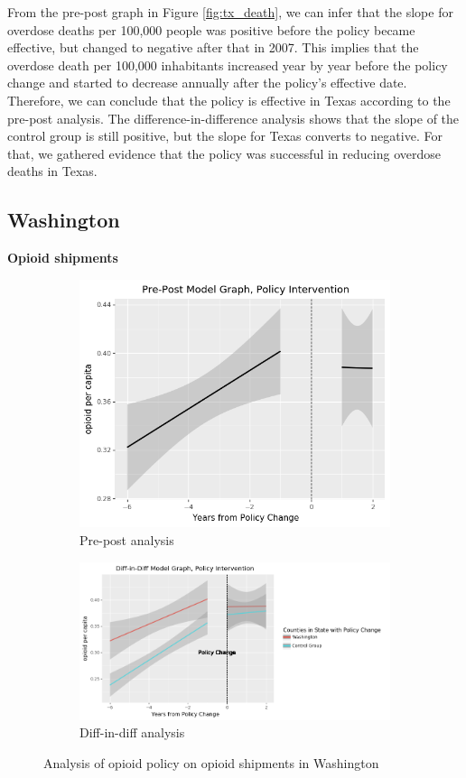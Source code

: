\documentclass[12pt,letterpaper]{article}
\begin{document}
From the pre-post graph in Figure \ref{fig:tx_death}, we can infer that the slope for overdose deaths per 100,000 people was positive before the policy became effective, but changed to negative after that in 2007. This implies that the overdose death per 100,000 inhabitants increased year by year before the policy change and started to decrease annually after the policy's effective date. Therefore, we can conclude that the policy is effective in Texas according to the pre-post analysis. The difference-in-difference analysis shows that the slope of  the control group is still positive, but the slope for Texas converts to negative. For that, we gathered evidence that the policy was successful in reducing overdose deaths in Texas.

\subsection{Washington}
\textbf{Opioid shipments}

\begin{figure}[!h]
\centering
\begin{subfigure}{.5\textwidth}
  \centering
  \includegraphics[width=0.7\linewidth]{../30_results/General_Results/washington_opioid_shipment_prepost.png}
  \caption{Pre-post analysis}
  \label{fig:wa_ship_prepost}
\end{subfigure}%
\begin{subfigure}{.55\textwidth}
  \centering
  \includegraphics[width=1\linewidth]{../30_results/General_Results/washington_opioid_shipment_diffdiff.png}
  \caption{Diff-in-diff analysis}
  \label{fig:wa_ship_did}
\end{subfigure}
\caption{Analysis of opioid policy on opioid shipments in Washington}
\label{fig:wa_ship}
\end{figure}
\end{document}
